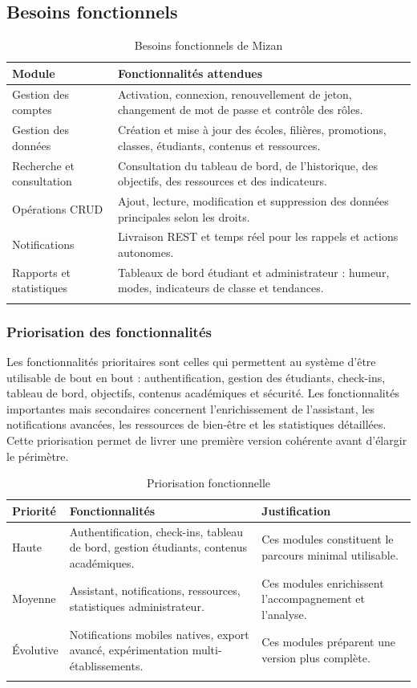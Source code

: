 \documentclass{rapportENSET}
\begin{document}
\subsection{Besoins fonctionnels}
\begin{longtable}{@{}L{0.28\textwidth}L{0.62\textwidth}@{}}
\toprule
\textbf{Module} & \textbf{Fonctionnalités attendues} \\
\midrule
\endhead
Gestion des comptes & Activation, connexion, renouvellement de jeton, changement de mot de passe et contrôle des rôles. \\
Gestion des données & Création et mise à jour des écoles, filières, promotions, classes, étudiants, contenus et ressources. \\
Recherche et consultation & Consultation du tableau de bord, de l'historique, des objectifs, des ressources et des indicateurs. \\
Opérations CRUD & Ajout, lecture, modification et suppression des données principales selon les droits. \\
Notifications & Livraison REST et temps réel pour les rappels et actions autonomes. \\
Rapports et statistiques & Tableaux de bord étudiant et administrateur : humeur, modes, indicateurs de classe et tendances. \\
\bottomrule
\caption{Besoins fonctionnels de Mizan}
\end{longtable}

\subsubsection*{Priorisation des fonctionnalités}
Les fonctionnalités prioritaires sont celles qui permettent au système d'être utilisable de bout en bout : authentification, gestion des étudiants, check-ins, tableau de bord, objectifs, contenus académiques et sécurité. Les fonctionnalités importantes mais secondaires concernent l'enrichissement de l'assistant, les notifications avancées, les ressources de bien-être et les statistiques détaillées. Cette priorisation permet de livrer une première version cohérente avant d'élargir le périmètre.

\begin{longtable}{@{}L{0.18\textwidth}L{0.42\textwidth}L{0.30\textwidth}@{}}
\toprule
\textbf{Priorité} & \textbf{Fonctionnalités} & \textbf{Justification} \\
\midrule
\endhead
Haute & Authentification, check-ins, tableau de bord, gestion étudiants, contenus académiques. & Ces modules constituent le parcours minimal utilisable. \\
Moyenne & Assistant, notifications, ressources, statistiques administrateur. & Ces modules enrichissent l'accompagnement et l'analyse. \\
Évolutive & Notifications mobiles natives, export avancé, expérimentation multi-établissements. & Ces modules préparent une version plus complète. \\
\bottomrule
\caption{Priorisation fonctionnelle}
\end{longtable}
\end{document}

